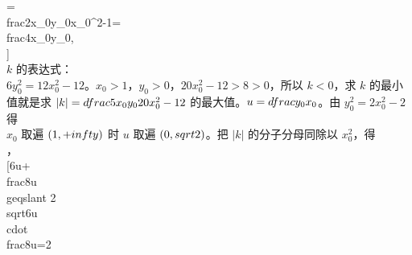 =\\frac{2x_0y_0}{x_0^2-1}=\\frac{4x_0}{y_0},\n\\]\n\\[\ns_1^2+s_2^2=(s_1+s_2)^2-2s_1s_2=\\frac{16x_0^2}{y_0^2}-4 .\n\\] $k$ 的表达式：\n\\[\nk=-\\frac{\\dfrac{4x_0}{y_0}\\times(1+4)}{2\\left(\\dfrac{16x_0^2}{y_0^2}-4+16\\right)}\n=-\\frac{20x_0y_0}{32x_0^2+24y_0^2}\n=-\\frac{5x_0y_0}{8x_0^2+6y_0^2}\n=-\\frac{5x_0y_0}{20x_0^2-12},\n\\] $6y_0^2=12x_0^2-12$。\n{} $x_0>1$，$y_0>0$，$20x_0^2-12>8>0$，所以 $k<0$，求 $k$ 的最小值就是求 $|k|=\\dfrac{5x_0y_0}{20x_0^2-12}$ 的最大值。\n{} $u=\\dfrac{y_0}{x_0}$。由 $y_0^2=2x_0^2-2$ 得\n\\[\nu^2=2-\\frac{2}{x_0^2},\\qquad \\frac{1}{x_0^2}=\\frac{2-u^2}{2},\n\\] $x_0$ 取遍 $(1,+\\infty)$ 时 $u$ 取遍 $(0,\\sqrt{2})$。把 $|k|$ 的分子分母同除以 $x_0^2$，得\n\\[\n|k|=\\frac{5u}{20-\\dfrac{12}{x_0^2}}=\\frac{5u}{20-6\\left(2-u^2\\right)}=\\frac{5u}{8+6u^2}=\\frac{5}{6u+\\dfrac{8}{u}} .\n\\]，\n\\[\n6u+\\frac{8}{u}\\geqslant 2\\sqrt{6u\\cdot\\frac{8}{u}}=2\